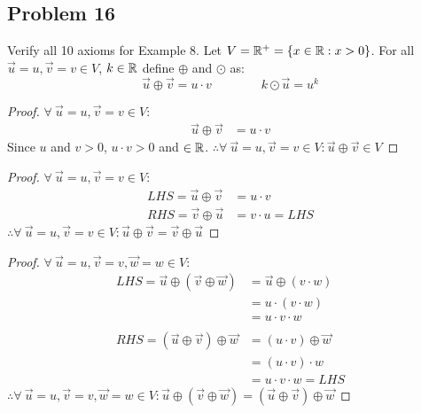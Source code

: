 \subsection*{Problem 16}
Verify all 10 axioms for Example 8. Let $V = \mathbb{R}^+ = \{x \in \mathbb{R}: x>0\}$. For all $\vec{u} = u,\vec{v} = v \in V$, $k\in \mathbb{R}$ define $\oplus$ and $\odot$ as:
\[
  \vec{u} \oplus \vec{v} = u \cdot v\qquad\qquad k \odot \vec{u} = u^k
\]
\begin{enumerate}
  \begin{proof}
    $\forall~\vec{u}=u,\vec{v}=v \in V$:
    \begin{align*}
      \vec{u} \oplus \vec{v} & = u \cdot v
    \end{align*}
    Since $u$ and $v > 0$, $u \cdot v > 0$ and $\in \mathbb{R}$. $\therefore \forall~\vec{u}=u,\vec{v}=v \in V: \vec{u} \oplus \vec{v} \in V$
  \end{proof}
  \begin{proof}
    $\forall~\vec{u}=u,\vec{v}=v \in V$:
    \begin{align*}
      LHS = \vec{u} \oplus \vec{v} & = u \cdot v       \\
      RHS = \vec{v} \oplus \vec{u} & = v \cdot u = LHS
    \end{align*}
    $\therefore \forall~\vec{u}=u,\vec{v}=v \in V: \vec{u} \oplus \vec{v} = \vec{v} \oplus \vec{u}$
  \end{proof}
  \begin{proof}
    $\forall~\vec{u}=u,\vec{v}=v,\vec{w}=w \in V$:
    \begin{align*}
      LHS = \vec{u} \oplus (\vec{v} \oplus \vec{w}) & = \vec{u} \oplus (v \cdot w) \\
                                                    & = u \cdot (v \cdot w)        \\
                                                    & = u \cdot v \cdot w          \\ \\
      RHS = (\vec{u} \oplus \vec{v}) \oplus \vec{w} & = (u \cdot v) \oplus \vec{w} \\
                                                    & = (u \cdot v) \cdot w        \\
                                                    & = u \cdot v \cdot w = LHS
    \end{align*}
    $\therefore \forall~\vec{u}=u,\vec{v}=v,\vec{w}=w \in V: \vec{u} \oplus (\vec{v} \oplus \vec{w}) = (\vec{u} \oplus \vec{v}) \oplus \vec{w}$

\end{proof}
\end{enumerate}
